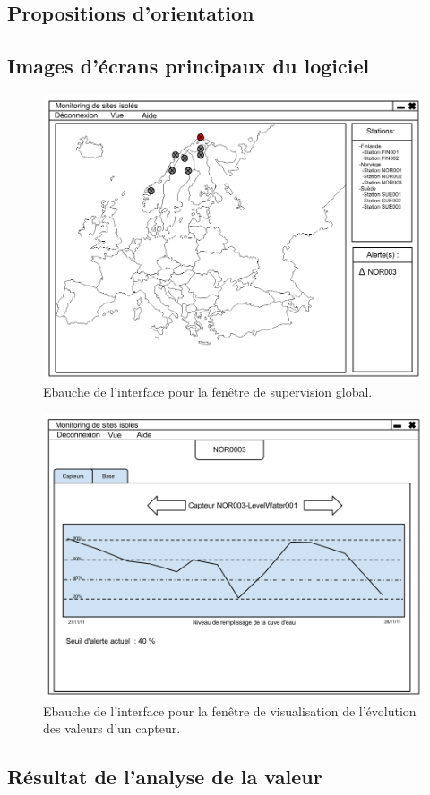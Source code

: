 \subsection{Propositions d'orientation}

\subsection{Images d'écrans principaux du logiciel}

\begin{figure}[hb]
  \centering
  \includegraphics[width=15cm]{Supervision/InterfaceSupervision1.png}
  \caption[Ebauche de l'interface pour la fenêtre de supervision global.]%
  {Ebauche de l'interface pour la fenêtre de supervision global.}
\end{figure}

\begin{figure}[hb]
  \centering
  \includegraphics[width=15cm]{Supervision/InterfaceSupervision2.png}
  \caption[Ebauche de l'interface pour la fenêtre de visualisation de l'évolution des valeurs d'un capteur.]%
  {Ebauche de l'interface pour la fenêtre de visualisation de l'évolution des valeurs d'un capteur.}
\end{figure}
 
\subsection{Résultat de l'analyse de la valeur}
